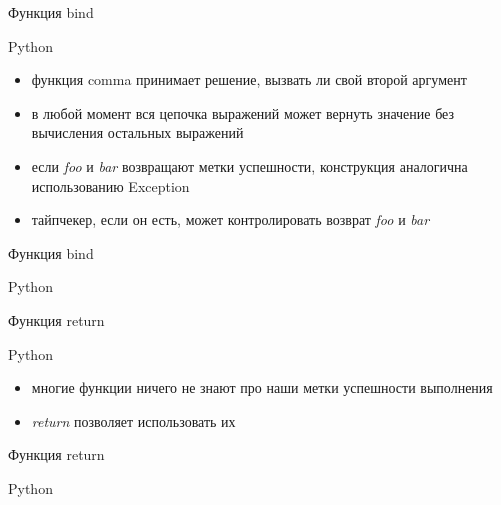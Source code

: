 \documentclass[10pt]{beamer}
\begin{document}
\begin{frame}{Функция bind}
  \begin{block}{Python}
    \centering
    \small
    \lstset{language=python}
    
  \end{block}
  \begin{itemize}
  \item функция comma принимает решение, вызвать ли свой второй аргумент
  \item в любой момент вся цепочка выражений может вернуть значение без вычисления остальных выражений
  \item если \emph{foo} и \emph{bar} возвращают метки успешности, конструкция аналогична использованию Exception
  \item тайпчекер, если он есть, может контролировать возврат \emph{foo} и \emph{bar}
  \end{itemize}
\end{frame}

\begin{frame}{Функция bind}
  \begin{block}{Python}
    \centering
    \small
    \lstset{language=python}
    
  \end{block}
\end{frame}

\begin{frame}{Функция return}
  \begin{block}{Python}
    \centering
    \small
    \lstset{language=python}
    
  \end{block}
  \begin{itemize}
  \item многие функции ничего не знают про наши метки успешности выполнения
  \item \emph{return} позволяет использовать их
  \end{itemize}
\end{frame}

\begin{frame}{Функция return}
  \begin{block}{Python}
    \centering
    \small
    \lstset{language=python}
    
  \end{block}
\end{frame}
\end{document}
